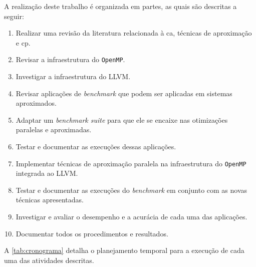 A realização deste trabalho é organizada em partes, as quais são descritas a seguir:

\begin{enumerate}
	\item Realizar uma revisão da literatura relacionada à \gls{ca}, técnicas de aproximação e \gls{cp}.
	\item Revisar a infraestrutura do \texttt{OpenMP}.
	\item Investigar a infraestrutura do LLVM.
	\item Revisar aplicações de \textit{benchmark} que podem ser aplicadas em sistemas aproximados.
	\item Adaptar um \textit{benchmark suite} para que ele se encaixe nas otimizações paralelas e aproximadas.
	\item Testar e documentar as execuções dessas aplicações.
	\item Implementar técnicas de aproximação paralela na infraestrutura do \texttt{OpenMP} integrada ao LLVM.
	\item Testar e documentar as execuções do \textit{benchmark} em conjunto com as novas técnicas apresentadas.
	\item Investigar e avaliar o desempenho e a acurácia de cada uma das aplicações.
	\item Documentar todos os procedimentos e resultados.
\end{enumerate}

A \autoref{tab:cronograma} detalha o planejamento temporal para a execução de cada uma das atividades descritas.

